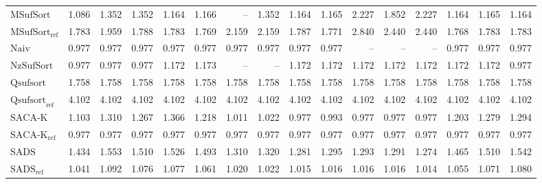 \begin{table}
{\begin{tabular}{lrrrrrrrrrrrrrrr}
    $\text{MSufSort}$ & 1.086 & 1.352 & 1.352 & 1.164 & 1.166 & {\color{darkgray}--} & 1.352 & 1.164 & 1.165 & 2.227 & 1.852 & 2.227 & 1.164 & 1.165 & 1.164 \\
    $\text{MSufSort}_{\text{ref}}$ & 1.783 & 1.959 & 1.788 & 1.783 & 1.769 & 2.159 & 2.159 & 1.787 & 1.771 & 2.840 & 2.440 & 2.440 & 1.768 & 1.783 & 1.783 \\
    $\text{Naiv}$ & {\color{green!60!black}0.977} & {\color{green!60!black}0.977} & {\color{green!60!black}0.977} & {\color{green!60!black}0.977} & {\color{green!60!black}0.977} & {\color{green!60!black}0.977} & {\color{green!60!black}0.977} & {\color{green!60!black}0.977} & {\color{green!60!black}0.977} & {\color{darkgray}--} & {\color{darkgray}--} & {\color{darkgray}--} & {\color{green!60!black}0.977} & {\color{green!60!black}0.977} & {\color{green!60!black}0.977} \\
    $\text{NzSufSort}$ & {\color{green!60!black}0.977} & {\color{green!60!black}0.977} & 0.977 & 1.172 & 1.173 & {\color{darkgray}--} & {\color{darkgray}--} & 1.172 & 1.172 & 1.172 & 1.172 & 1.172 & 1.172 & 1.172 & 0.977 \\
    $\text{Qsufsort}$ & 1.758 & 1.758 & 1.758 & 1.758 & 1.758 & 1.758 & 1.758 & 1.758 & 1.758 & 1.758 & 1.758 & 1.758 & 1.758 & 1.758 & 1.758 \\
    $\text{Qsufsort}_{\text{ref}}$ & 4.102 & 4.102 & 4.102 & 4.102 & 4.102 & 4.102 & 4.102 & 4.102 & 4.102 & 4.102 & 4.102 & 4.102 & 4.102 & 4.102 & 4.102 \\
    $\text{SACA-K}$ & 1.103 & 1.310 & 1.267 & 1.366 & 1.218 & 1.011 & 1.022 & 0.977 & 0.993 & {\color{green!60!black}0.977} & {\color{green!60!black}0.977} & {\color{green!60!black}0.977} & 1.203 & 1.279 & 1.294 \\
    $\text{SACA-K}_{\text{ref}}$ & {\color{green!60!black}0.977} & {\color{green!60!black}0.977} & {\color{green!60!black}0.977} & {\color{green!60!black}0.977} & {\color{green!60!black}0.977} & {\color{green!60!black}0.977} & {\color{green!60!black}0.977} & {\color{green!60!black}0.977} & {\color{green!60!black}0.977} & {\color{green!60!black}0.977} & {\color{green!60!black}0.977} & {\color{green!60!black}0.977} & {\color{green!60!black}0.977} & {\color{green!60!black}0.977} & {\color{green!60!black}0.977} \\
    $\text{SADS}$ & 1.434 & 1.553 & 1.510 & 1.526 & 1.493 & 1.310 & 1.320 & 1.281 & 1.295 & 1.293 & 1.291 & 1.274 & 1.465 & 1.510 & 1.542 \\
    $\text{SADS}_{\text{ref}}$ & 1.041 & 1.092 & 1.076 & 1.077 & 1.061 & 1.020 & 1.022 & 1.015 & 1.016 & 1.016 & 1.016 & 1.014 & 1.055 & 1.071 & 1.080 \\

\end{tabular}}
\end{table}
